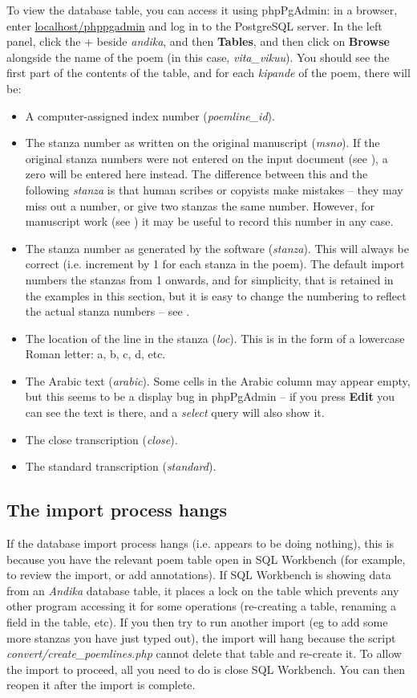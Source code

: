 To view the database table, you can access it using phpPgAdmin: in a browser, enter \url{localhost/phppgadmin} and log in to the PostgreSQL server.  In the left panel, click the + beside \textit{andika}, and then \textbf{Tables}, and then click on \textbf{Browse} alongside the name of the poem (in this case, \textit{vita_vikuu}).  You should see the first part of the contents of the table, and for each \textit{kipande} of the poem, there will be:
\begin{itemize}
\item A computer-assigned index number (\textit{poemline_id}).
\item The stanza number as written on the original manuscript (\textit{msno}).  If the original stanza numbers were not entered on the input document (see ), a zero will be entered here instead.  The difference between this and the following \textit{stanza} is that human scribes or copyists make mistakes -- they may miss out a number, or give two stanzas the same number.  However, for manuscript work (see ) it may be useful to record this number in any case.
\item The stanza number as generated by the software (\textit{stanza}).  This will always be correct (i.e. increment by 1 for each stanza in the poem). The default import numbers the stanzas from 1 onwards, and for simplicity, that is retained in the examples in this section, but it is easy to change the numbering to reflect the actual stanza numbers  -- see .
\item The location of the line in the stanza (\textit{loc}).  This is in the form of a lowercase Roman letter: a, b, c, d, etc.
\item The Arabic text (\textit{arabic}).  Some cells in the Arabic column may appear empty, but this seems to be a display bug in phpPgAdmin -- if you press \textbf{Edit} you can see the text is there, and a \textit{select} query will also show it.
\item The close transcription (\textit{close}).
\item The standard transcription (\textit{standard}).
\end{itemize}

\subsection{The import process hangs}

If the database import process hangs (i.e. appears to be doing nothing), this is because you have the relevant poem table open in SQL Workbench (for example, to review the import, or add annotations).  If SQL Workbench is showing data from an \textit{Andika} database table, it places a lock on the table which prevents any other program accessing it for some operations (re-creating a table, renaming a field in the table, etc).  If you then try to run another import (eg to add some more stanzas you have just typed out), the import will hang because the script \textit{convert/create_poemlines.php} cannot delete that table and re-create it.  To allow the import to proceed, all you need to do is close SQL Workbench.  You can then reopen it after the import is complete.

